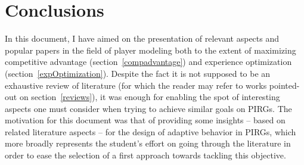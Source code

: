 \section{Conclusions}

In this document, I have aimed on the presentation of relevant aspects and popular papers in the field of player modeling both to the extent of maximizing competitive advantage (section~\ref{compadvantage}) and experience optimization (section~\ref{expOptimization}). Despite the fact it is not supposed to be an exhaustive review of literature (for which the reader may refer to works pointed-out on section~\ref{reviews}), it was enough for enabling the spot of interesting aspects one must consider when trying to achieve similar goals on PIRGs. The motivation for this document was that of providing some insights -- based on related literature aspects -- for the design of adaptive behavior in PIRGs, which more broadly represents the student's effort on going through the literature in order to ease the selection of a first approach towards tackling this objective. 
